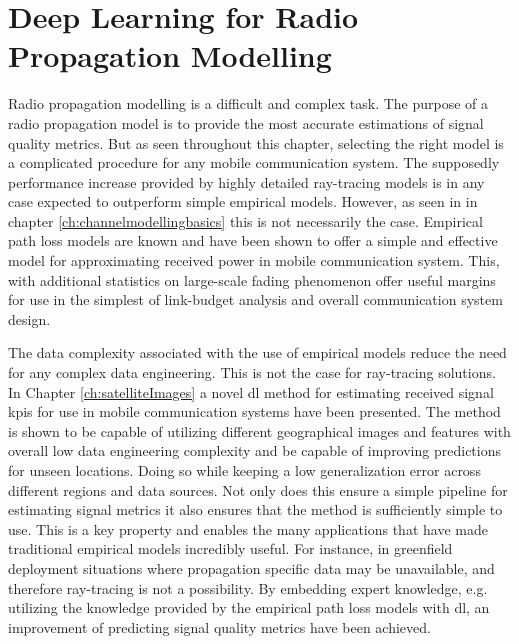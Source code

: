 \chapter{Deep Learning for Radio Propagation Modelling}\label{ch:dl_radio_summary}
Radio propagation modelling is a difficult and complex task. The purpose of a radio propagation model is to provide the most accurate estimations of signal quality metrics. But as seen throughout this chapter, selecting the right model is a complicated procedure for any mobile communication system. The supposedly performance increase provided by highly detailed ray-tracing models is in any case expected to outperform simple empirical models. However, as seen in in chapter \ref{ch:channelmodellingbasics} this is not necessarily the case. Empirical path loss models are known and have been shown to offer a simple and effective model for approximating received power in mobile communication system. This, with additional statistics on large-scale fading phenomenon offer useful margins for use in the simplest of link-budget analysis and overall communication system design. 

The data complexity associated with the use of empirical models reduce the need for any complex data engineering. This is not the case for ray-tracing solutions. In Chapter \ref{ch:satelliteImages} a novel \gls{dl} method for estimating received signal \glspl{kpi} for use in mobile communication systems have been presented. The method is shown to be capable of utilizing different geographical images and features with overall low data engineering complexity and be capable of improving predictions for unseen locations. Doing so while keeping a low generalization error across different regions and data sources. Not only does this ensure a simple pipeline for estimating signal metrics it also ensures that the method is sufficiently simple to use. This is a key property and enables the many applications that have made traditional empirical models incredibly useful. For instance, in greenfield deployment situations where propagation specific data may be unavailable, and therefore ray-tracing is not a possibility. By embedding expert knowledge, e.g. utilizing the knowledge provided by the empirical path loss models with \gls{dl}, an improvement of predicting signal quality metrics have been achieved.

